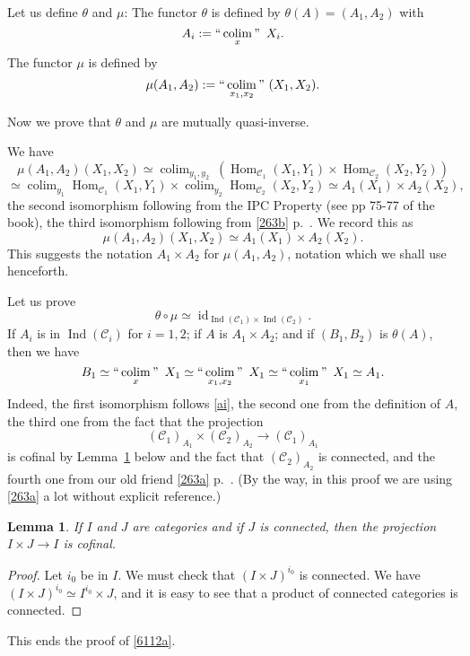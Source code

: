 \documentclass[12pt]{article}%
\newtheorem{lem}[thm]{Lemma}
\theoremstyle{remark}
\theoremstyle{definition}
\newcommand{\C}{\mathcal C}
\DeclareMathOperator*{\colim}{colim}%
\DeclareMathOperator*{\ic}{``\colim"}
\DeclareMathOperator{\id}{id}
\DeclareMathOperator{\Hom}{Hom}%
\DeclareMathOperator{\Ind}{Ind}
\begin{document}
Let us define $\theta$ and $\mu$: The functor $\theta$ is defined by $\theta(A)=(A_1,A_2)$ with
%
\begin{equation}\label{ai}
A_i:=\ic_x\ X_i. 
\end{equation}
%
The functor $\mu$ is defined by 
$$
\mu(A_1,A_2):=\ic_{x_1,x_2}\ (X_1,X_2). 
$$ 

Now we prove that $\theta$ and $\mu$ are mutually quasi-inverse.

We have 
$$
\mu(A_1,A_2)(X_1,X_2)\simeq\colim_{y_1,y_2}\ (\Hom_{\C_1}(X_1,Y_1)\times\Hom_{\C_2}(X_2,Y_2))
$$
$$
\simeq\colim_{y_1}\Hom_{\C_1}(X_1,Y_1)\times\colim_{y_2}\Hom_{\C_2}(X_2,Y_2)\simeq A_1(X_1)\times A_2(X_2),
$$ 
the second isomorphism following from the IPC Property (see pp 75-77 of the book), the third isomorphism following from \eqref{263b} p.~\pageref{263b}. We record this as
$$
\mu(A_1,A_2)(X_1,X_2)\simeq A_1(X_1)\times A_2(X_2).
$$
This suggests the notation $A_1\times A_2$ for $\mu(A_1,A_2)$, notation which we shall use henceforth.

Let us prove
%
\begin{equation}\label{6112a}
\theta\circ\mu\simeq\id_{\Ind(\C_1)\times\Ind(\C_2)}.
\end{equation}
%
If $A_i$ is in $\Ind(\C_i)$ for $i=1,2$; if $A$ is $A_1\times A_2$; and if $(B_1,B_2)$ is $\theta(A)$, then we have 
$$ 
B_1\simeq\ic_x\ X_1\simeq\ic_{x_1,x_2}\ X_1\simeq\ic_{x_1}\ X_1\simeq A_1.
$$ 
Indeed, the first isomorphism follows \eqref{ai}, the second one from the definition of $A$, the third one from the fact that the projection 
$$
(\C_1)_{A_1}\times(\C_2)_{A_2}\to(\C_1)_{A_1}
$$ 
is cofinal by Lemma~\ref{proj} below and the fact that $(\C_2)_{A_2}$ is connected, and the fourth one from our old friend \eqref{263a} p.~\pageref{263a}. (By the way, in this proof we are using \eqref{263a} a lot without explicit reference.)

\begin{lem}\label{proj}
If $I$ and $J$ are categories and if $J$ is connected, then the projection $I\times J\to I$ is cofinal.
\end{lem}

\begin{proof}
Let $i_0$ be in $I$. We must check that $(I\times J)^{i_0}$ is connected. We have $(I\times J)^{i_0}\simeq I^{i_0}\times J$, and it is easy to see that a product of connected categories is connected. 
\end{proof}

This ends the proof of \eqref{6112a}.
\end{document}
